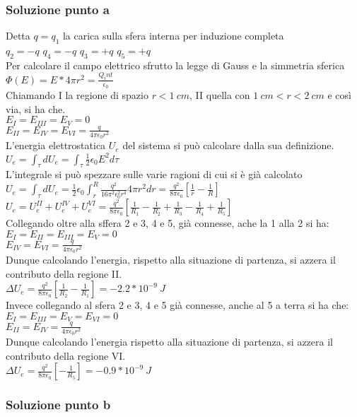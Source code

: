 \documentclass[../../main.tex]{subfiles}
\begin{document}
\subsubsection*{Soluzione punto a}
Detta $q = q_1$ la carica sulla sfera interna per induzione completa
\\$q_2 = -q$   $q_4 = -q$   $q_3 = +q$   $q_5 = +q$
\\Per calcolare il campo elettrico sfrutto la legge di Gauss e la simmetria sferica
\\$\Phi(E) = E* 4\pi r^2=\frac{Q_int}{\epsilon_0}$
\\Chiamando I la regione di spazio $r < 1\ cm$, II quella con $1\ cm < r<2\ cm$ e così via, si ha che.
\\$E_I = E_{III} = E_V = 0$
\\$E_{II} = E_{IV} = E_{VI} = \frac{q}{4\pi\epsilon_0r^2}$
\\L'energia elettrostatica $U_e$ del sistema si può calcolare dalla sua definizione.
\\$U_e = \int_\tau dU_e = \int_\tau\frac{1}{2}\epsilon_0E^2d\tau$
\\L'integrale si può spezzare sulle varie ragioni di cui si è già calcolato
\\$U_e = \int_\tau dU_e = \frac{1}{2}\epsilon_0\int_r^R \frac{q^2}{16\pi^2\epsilon_0^2r^4}4\pi r^2dr = \frac{q^2}{8\pi\epsilon_0}\left[\frac{1}{r}-\frac{1}{R}\right]$
\\$U_e = U_e^{II} + U_e^{IV} + U_e^{VI} = \frac{q^2}{8\pi\epsilon_0}\left[\frac{1}{R_1}-\frac{1}{R_2}+\frac{1}{R_3}-\frac{1}{R_4}+\frac{1}{R_5}\right]$
\\Collegando oltre alla sffera 2 e 3, 4 e 5, già connesse, ache la 1 alla 2 si ha:
\\$E_I=E_{II} = E_{III}= E_V = 0$
\\$E_{IV} = E_{VI} = \frac{q}{4\pi\epsilon_0 r^2}$
\\Dunque calcolando l'energia, rispetto alla situazione di partenza, si azzera il contributo della regione II.
\\$\Delta U_e = \frac{q^2}{8\pi\epsilon_0}\left[\frac{1}{R_2}-\frac{1}{R_1}\right] = -2.2 * 10^{-9}\ J$
\\Invece collegando al sfera 2 e 3, 4 e 5 già connesse, anche al 5 a terra si ha che:
\\$E_I = E_{III} = E_V = E_{VI} = 0$
\\$E_{II} = E_{IV} = \frac{q}{4\pi\epsilon_0 r^2}$
\\Dunque calcolando l'energia rispetto alla situazione di partenza, si azzera il contributo della regione VI.
\\$\Delta U_e = \frac{q^2}{8\pi\epsilon_0}\left[-\frac{1}{R_5}\right] = -0.9*10^{-9}\ J$
\subsubsection*{Soluzione punto b}
\newpage
\end{document}
